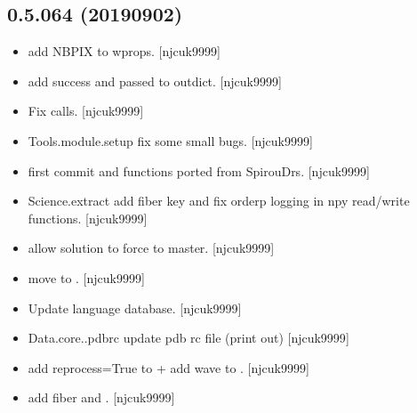 \documentclass[a4paper,10pt,english]{report}
\begin{document}
\subsection{0.5.064 (2019\sphinxhyphen{}09\sphinxhyphen{}02)}
\label{\detokenize{misc/changelog:id97}}\begin{itemize}
\item {} 
 \sphinxhyphen{} add NBPIX to wprops. {[}njcuk9999{]}

\item {} 
 \sphinxhyphen{} add success and passed to outdict.
{[}njcuk9999{]}

\item {} 
Fix  calls. {[}njcuk9999{]}

\item {} 
Tools.module.setup \sphinxhyphen{} fix some small bugs. {[}njcuk9999{]}

\item {} 
 \sphinxhyphen{} first commit and functions ported from SpirouDrs.
{[}njcuk9999{]}

\item {} 
Science.extract \sphinxhyphen{} add fiber key and fix orderp logging in npy
read/write functions. {[}njcuk9999{]}

\item {} 
 \sphinxhyphen{} allow  solution to force to
master. {[}njcuk9999{]}

\item {} 
 \sphinxhyphen{} move  to .
{[}njcuk9999{]}

\item {} 
Update language database. {[}njcuk9999{]}

\item {} 
Data.core..pdbrc \sphinxhyphen{} update pdb rc file (print out) {[}njcuk9999{]}

\item {} 
 \sphinxhyphen{} add reprocess=True to  + add
wave to . {[}njcuk9999{]}

\item {} 
 \sphinxhyphen{} add fiber and .
{[}njcuk9999{]}


\end{itemize}
\end{document}
